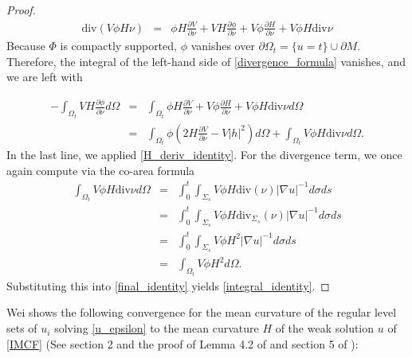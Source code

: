 \documentclass[12pt,twoside]{article}
\theoremstyle{plain}
\theoremstyle{definition}
\theoremstyle{remark}
\newtheorem*{remark}{Remark}
\numberwithin{equation}{section}
\begin{document}
\begin{proof}
\begin{eqnarray} \label{divergence_formula}
    \text{div}( V \phi H \nu) &=& \phi H \frac{\partial V}{\partial \nu} + V H \frac{\partial \phi}{\partial \nu} + V \phi \frac{\partial H}{\partial \nu} + V\phi H \text{div} \nu
\end{eqnarray}
Because $\Phi$ is compactly supported, $\phi$ vanishes over $\partial \Omega_{t}= \{ u = t\} \cup \partial M$. Therefore, the integral of the left-hand side of \eqref{divergence_formula} vanishes, and we are left with

\begin{eqnarray} \label{final_identity}
    -\int_{\Omega_{t}} VH \frac{\partial \phi}{\partial \nu} d\Omega &=& \int_{\Omega_{t}} \phi H \frac{\partial V}{\partial \nu} + V \phi \frac{\partial H}{\partial \nu} + V\phi H \text{div} \nu d\Omega \\
    &=& \int_{\Omega_{t}} \phi( 2H \frac{\partial V}{\partial \nu} - V|h|^{2}) d\Omega + \int_{\Omega_{t}} V\phi H \text{div} \nu d\Omega. \nonumber
\end{eqnarray}
In the last line, we applied \eqref{H_deriv_identity}. For the divergence term, we once again compute via the co-area formula
\begin{eqnarray*}
    \int_{\Omega_{t}} V\phi H \text{div} \nu d\Omega &=& \int_{0}^{t} \int_{\Sigma_{s}} V \phi H \text{div}(\nu) |\nabla u|^{-1} d\sigma ds \\
    &=& \int_{0}^{t} \int_{\Sigma_{s}} V \phi H \text{div}_{\Sigma_{s}}(\nu) |\nabla u|^{-1} d\sigma ds \\
    &=& \int_{0}^{t} \int_{\Sigma_{s}} V \phi H^{2} |\nabla u|^{-1} d\sigma ds \\
    &=& \int_{\Omega_{t}} V\phi H^{2} d\Omega.
\end{eqnarray*}
Substituting this into \eqref{final_identity} yields \eqref{integral_identity}.
\end{proof}

Wei shows the following convergence for the mean curvature of the regular level sets of $u_{i}$ solving \eqref{u_epsilon} to the mean curvature $H$ of the weak solution $u$ of \eqref{IMCF} (See section 2 and the proof of Lemma 4.2 of \cite{Wei} and section 5 of \cite{HI}):
\end{document}
